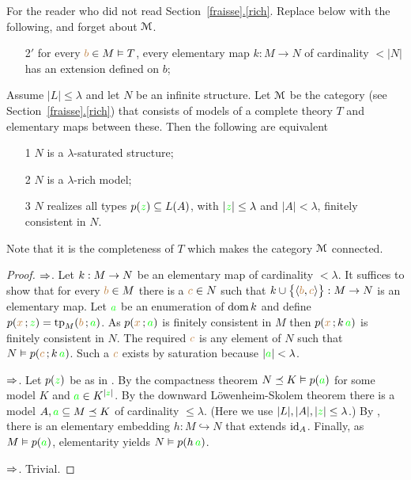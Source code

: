 \documentclass[creche.tex]{subfiles}
\begin{document}
\begin{remark}
For the reader who did not read Section~\hyperref[rich]{\ref*{fraisse}.\ref*{rich}}. Replace  below with the following, and forget about $\EuScript M$.
\begin{itemize}
\item[2$'$] for every ${\color{brown} b}\in M\vDash T$,  every elementary map $k:M\to N$ of cardinality $<|N|$ has an extension defined on $b$;
\end{itemize}
\end{remark}


\begin{theorem}\label{saturo->ricco}
Assume $|L|\le\lambda$ and let $N$ be an infinite structure. Let $\EuScript M$ be the category (see Section~\hyperref[rich]{\ref*{fraisse}.\ref*{rich}}) that consists of models of a complete theory $T$ and elementary maps between these. Then the following are equivalent
\begin{itemize}
\item[1] $N$ is a $\lambda$-saturated structure;
\item[2] $N$ is a $\lambda$-rich model;
\item[3] $N$ realizes all types $p({\color{green} z})\subseteq L(A)$, with $|{\color{green} z}|\le\lambda$ and $|A|<\lambda$, finitely consistent in $N$.
\end{itemize}
\end{theorem}

Note that it is the completeness of $T$ which makes the category $\EuScript M$ connected.

\begin{proof}
$\Rightarrow$. Let $k:M\rightarrow N$ be an elementary map of cardinality $<\lambda$. It suffices to show that for every ${\color{brown} b}\in M$ there is a ${\color{brown} c}\in N$ such that $k\cup\big\{\langle{\color{brown}b},{\color{brown} c}\rangle\big\}:M\to N$ is an elementary map. Let ${\color{green} a}$ be an enumeration of $\mathop{\rm dom} k$ and define $p({\color{brown} x}\,;{\color{green} z})={\rm tp}_M({\color{brown} b}\,;{\color{green} a})$. As $p({\color{brown} x}\,;{\color{green} a})$ is finitely consistent in $M$ then $p({\color{brown} x}\,;k\,{\color{green} a})$ is finitely consistent in $N$. The required ${\color{brown} c}$ is any element of $N$ such that $N\vDash p({\color{brown} c}\,;k\,{\color{green} a})$. Such a ${\color{brown} c}$ exists by saturation because $|{\color{green} a}|<\lambda$.

$\Rightarrow$. Let $p({\color{green} z})$ be as in . By the compactness theorem $N\preceq K\vDash p({\color{green} a})$ for some model $K$ and ${\color{green} a}\in K^{|{\color{green} z}|}$. By the downward  L\"owenheim-Skolem theorem there is a model $A,{\color{green} a}\subseteq M\preceq K$ of cardinality $\le\lambda$. (Here we use $|L|,|A|,|{\color{green} z}|\le\lambda$.) By , there is an elementary embedding $h:M\hookrightarrow N$ that extends $\textrm{id}_A$. Finally, as $M\vDash p({\color{green} a})$,  elementarity yields $N\vDash p(h\,{\color{green} a})$.

$\Rightarrow$.  Trivial. 
\end{proof}
\end{document}
